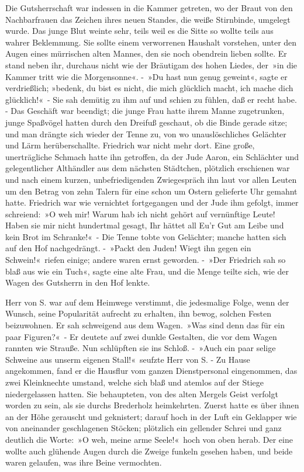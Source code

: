 Die Gutsherrschaft war indessen in die Kammer getreten, wo der Braut von den Nachbarfrauen das Zeichen ihres neuen Standes, die weiße Stirnbinde, umgelegt wurde. Das junge Blut weinte sehr, teils weil es die Sitte so wollte teils aus wahrer Beklemmung. Sie sollte einem verworrenen Haushalt vorstehen, unter den Augen eines mürrischen alten Mannes, den sie noch obendrein lieben sollte. Er stand neben ihr, durchaus nicht wie der Bräutigam des hohen Liedes, der »in die Kammer tritt wie die Morgensonne«. - »Du hast nun genug geweint«, sagte er verdrießlich; »bedenk, du bist es nicht, die mich glücklich macht, ich mache dich glücklich!« - Sie sah demütig zu ihm auf und schien zu fühlen, daß er recht habe. - Das Geschäft war beendigt; die junge Frau hatte ihrem Manne zugetrunken, junge Spaßvögel hatten durch den Dreifuß geschaut, ob die Binde gerade sitze; und man drängte sich wieder der Tenne zu, von wo unauslöschliches Gelächter und Lärm herüberschallte. Friedrich war nicht mehr dort. Eine große, unerträgliche Schmach hatte ihn getroffen, da der Jude Aaron, ein Schlächter und gelegentlicher Althändler aus dem nächsten Städtchen, plötzlich erschienen war und nach einem kurzen, unbefriedigenden Zwiegespräch ihn laut vor allen Leuten um den Betrag von zehn Talern für eine schon um Ostern gelieferte Uhr gemahnt hatte. Friedrich war wie vernichtet fortgegangen und der Jude ihm gefolgt, immer schreiend: »O weh mir! Warum hab ich nicht gehört auf vernünftige Leute! Haben sie mir nicht hundertmal gesagt, Ihr hättet all Eu’r Gut am Leibe und kein Brot im Schranke!« - Die Tenne tobte von Gelächter; manche hatten sich auf den Hof nachgedrängt. - »Packt den Juden! Wiegt ihn gegen ein Schwein!« riefen einige; andere waren ernst geworden. - »Der Friedrich sah so blaß aus wie ein Tuch«, sagte eine alte Frau, und die Menge teilte sich, wie der Wagen des Gutsherrn in den Hof lenkte.

Herr von S. war auf dem Heimwege verstimmt, die jedesmalige Folge, wenn der Wunsch, seine Popularität aufrecht zu erhalten, ihn bewog, solchen Festen beizuwohnen. Er sah schweigend aus dem Wagen. »Was sind denn das für ein paar Figuren?« - Er deutete auf zwei dunkle Gestalten, die vor dem Wagen rannten wie Strauße. Nun schlüpften sie ins Schloß. - »Auch ein paar selige Schweine aus unserm eigenen Stall!« seufzte Herr von S. - Zu Hause angekommen, fand er die Hausflur vom ganzen Dienstpersonal eingenommen, das zwei Kleinknechte umstand, welche sich blaß und atemlos auf der Stiege niedergelassen hatten. Sie behaupteten, von des alten Mergels Geist verfolgt worden zu sein, als sie durchs Brederholz heimkehrten. Zuerst hatte es über ihnen an der Höhe gerauscht und geknistert; darauf hoch in der Luft ein Geklapper wie von aneinander geschlagenen Stöcken; plötzlich ein gellender Schrei und ganz deutlich die Worte: »O weh, meine arme Seele!« hoch von oben herab. Der eine wollte auch glühende Augen durch die Zweige funkeln gesehen haben, und beide waren gelaufen, was ihre Beine vermochten.

